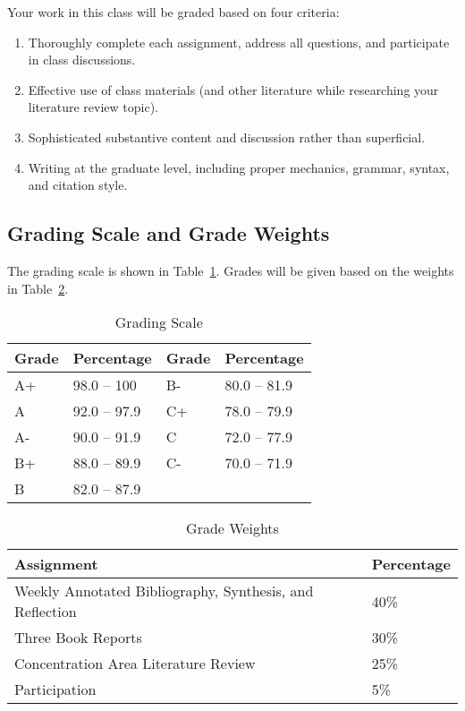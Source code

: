 \documentclass[12pt, letterpaper]{article}
\begin{document}
Your work in this class will be graded based on four criteria:
    \begin{enumerate}
        \item Thoroughly complete each assignment, address all questions, and participate in class discussions.
        \item Effective use of class materials (and other literature while researching your literature review topic).
        \item Sophisticated substantive content and discussion rather than superficial.
        \item Writing at the graduate level, including proper mechanics, grammar, syntax, and citation style.
    \end{enumerate}

\subsection*{Grading Scale and Grade Weights}  

The grading scale is shown in Table~\ref{tab:grading-scale}. Grades will be given based on the weights in Table~\ref{tab:grade-weights}.

\begin{table}[h]
\centering
\caption{Grading Scale}
\begin{tabular}{llll}
\toprule
\textbf{Grade} & \textbf{Percentage} & \textbf{Grade} & \textbf{Percentage} \\
\midrule
A+ & 98.0 -- 100 & B- & 80.0 -- 81.9\\
A & 92.0 -- 97.9 & C+ & 78.0 -- 79.9\\
A- & 90.0 -- 91.9 & C & 72.0 -- 77.9\\
B+ & 88.0 -- 89.9 & C- & 70.0 -- 71.9\\
B & 82.0 -- 87.9 & & \\
\bottomrule
\end{tabular}
\label{tab:grading-scale}
\end{table}


\begin{table}[h!]
\centering
\caption{Grade Weights}
\begin{tabular}{ll}
    \toprule
\textbf{Assignment} & \textbf{Percentage} \\
\midrule
Weekly Annotated Bibliography, Synthesis, and Reflection & 40\% \\
Three Book Reports & 30\% \\
Concentration Area Literature Review & 25\% \\
Participation & 5\% \\
\bottomrule
\end{tabular}
\label{tab:grade-weights}
\end{table}
\end{document}
